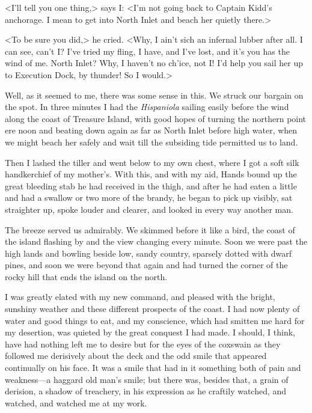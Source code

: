 <I'll tell you one thing,> says I: <I'm not going back to Captain Kidd's anchorage. I mean to get into North Inlet and beach her quietly there.>

<To be sure you did,> he cried. <Why, I ain't sich an infernal lubber after all. I can see, can't I\@? I've tried my fling, I have, and I've lost, and it's you has the wind of me. North Inlet? Why, I haven't no ch'ice, not I\@! I'd help you sail her up to Execution Dock, by thunder! So I would.>

Well, as it seemed to me, there was some sense in this. We struck our bargain on the spot. In three minutes I had the \textit{Hispaniola} sailing easily before the wind along the coast of Treasure Island, with good hopes of turning the northern point ere noon and beating down again as far as North Inlet before high water, when we might beach her safely and wait till the subsiding tide permitted us to land.

Then I lashed the tiller and went below to my own chest, where I got a soft silk handkerchief of my mother's. With this, and with my aid, Hands bound up the great bleeding stab he had received in the thigh, and after he had eaten a little and had a swallow or two more of the brandy, he began to pick up visibly, sat straighter up, spoke louder and clearer, and looked in every way another man.

The breeze served us admirably. We skimmed before it like a bird, the coast of the island flashing by and the view changing every minute. Soon we were past the high lands and bowling beside low, sandy country, sparsely dotted with dwarf pines, and soon we were beyond that again and had turned the corner of the rocky hill that ends the island on the north.

I was greatly elated with my new command, and pleased with the bright, sunshiny weather and these different prospects of the coast. I had now plenty of water and good things to eat, and my conscience, which had smitten me hard for my desertion, was quieted by the great conquest I had made. I should, I think, have had nothing left me to desire but for the eyes of the coxswain as they followed me derisively about the deck and the odd smile that appeared continually on his face. It was a smile that had in it something both of pain and weakness—a haggard old man's smile; but there was, besides that, a grain of derision, a shadow of treachery, in his expression as he craftily watched, and watched, and watched me at my work.